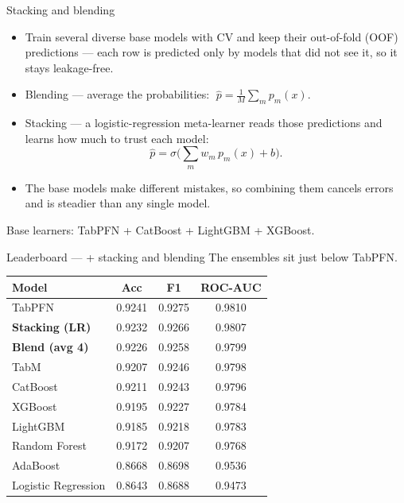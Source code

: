\documentclass[aspectratio=169]{beamer}
\begin{document}
\begin{frame}{Stacking and blending}
\small
\begin{itemize}
    \item Train several diverse base models with CV and keep their out-of-fold (OOF)
          predictions --- each row is predicted only by models that did not see it,
          so it stays leakage-free.
    \item Blending --- average the probabilities: $\;\hat{p}=\tfrac{1}{M}\sum_m p_m(x)$.
    \item Stacking --- a logistic-regression meta-learner reads those
          predictions and learns how much to trust each model:
    \[
    \hat{p}=\sigma\!\Big(\sum_m w_m\,p_m(x)+b\Big).
    \]
    \item The base models make different mistakes, so combining them cancels errors
          and is steadier than any single model.
\end{itemize}
\vspace{0.1cm}
{\footnotesize Base learners: TabPFN + CatBoost + LightGBM + XGBoost.}
\end{frame}

\begin{frame}{Leaderboard --- + stacking and blending}
\scriptsize
The ensembles sit just below TabPFN.
\vspace{0.15cm}
\begin{center}
\begin{tabular}{lccc}
\toprule
\textbf{Model} & \textbf{Acc} & \textbf{F1} & \textbf{ROC-AUC} \\
\midrule
TabPFN & 0.9241 & 0.9275 & 0.9810 \\
\rowcolor{accent!18}\textbf{Stacking (LR)} & 0.9232 & 0.9266 & 0.9807 \\
\rowcolor{accent!18}\textbf{Blend (avg 4)} & 0.9226 & 0.9258 & 0.9799 \\
TabM & 0.9207 & 0.9246 & 0.9798 \\
CatBoost & 0.9211 & 0.9243 & 0.9796 \\
XGBoost & 0.9195 & 0.9227 & 0.9784 \\
LightGBM & 0.9185 & 0.9218 & 0.9783 \\
Random Forest & 0.9172 & 0.9207 & 0.9768 \\
AdaBoost & 0.8668 & 0.8698 & 0.9536 \\
Logistic Regression & 0.8643 & 0.8688 & 0.9473 \\
\bottomrule
\end{tabular}
\end{center}
\end{frame}
\end{document}
